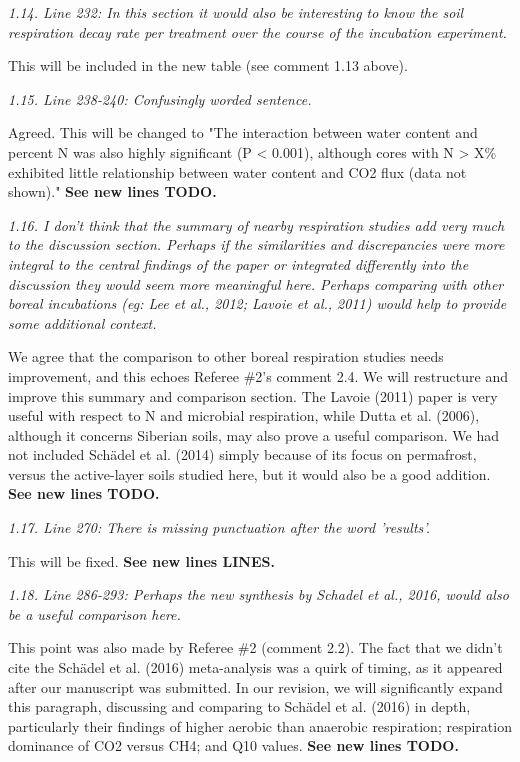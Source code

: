 \documentclass[11pt, oneside]{article}
\begin{document}
\medskip
{\it 1.14. Line 232: In this section it would also be interesting to know the soil respiration decay rate per treatment over the course of the incubation experiment. }

This will be included in the new table (see comment 1.13 above).

\medskip
{\it 1.15. Line 238-240: Confusingly worded sentence. }

Agreed. This will be changed to "The interaction between water content and percent N was also highly significant (P < 0.001), although cores with N > X\% exhibited little relationship between water content and CO2 flux (data not shown)." {\bf See new lines TODO.}

\medskip
{\it 1.16. I don't think that the summary of nearby respiration studies add very much to the discussion section. Perhaps if the similarities and discrepancies were more integral to the central findings of the paper or integrated differently into the discussion they would seem more meaningful here. Perhaps comparing with other boreal incubations (eg: Lee et al., 2012; Lavoie et al., 2011) would help to provide some additional context. }

We agree that the comparison to other boreal respiration studies needs improvement, and this echoes Referee \#2's comment 2.4. We will restructure and improve this summary and comparison section. The Lavoie (2011) paper is very useful with respect to N and microbial respiration, while Dutta et al. (2006), although it concerns Siberian soils, may also prove a useful comparison. We had not included Schädel et al. (2014) simply because of its focus on permafrost, versus the active-layer soils studied here, but it would also be a good addition. {\bf See new lines TODO.}

\medskip
{\it 1.17. Line 270: There is missing punctuation after the word 'results'. }

This will be fixed. {\bf See new lines LINES.}

\medskip
{\it 1.18. Line 286-293: Perhaps the new synthesis by Schadel et al., 2016, would also be a useful comparison here. }

This point was also made by Referee \#2 (comment 2.2). The fact that we didn't cite the Schädel et al. (2016) meta-analysis was a quirk of timing, as it appeared after our manuscript was submitted. In our revision, we will significantly expand this paragraph, discussing and comparing to Schädel et al. (2016) in depth, particularly their findings of higher aerobic than anaerobic respiration; respiration dominance of CO2 versus CH4; and Q10 values. {\bf See new lines TODO.}
\end{document}

